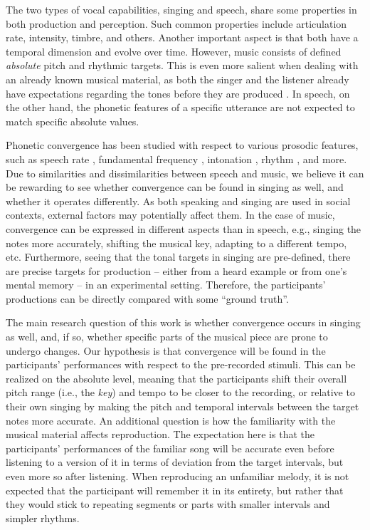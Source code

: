 The two types of vocal capabilities, singing and speech, share some properties in both production and perception.
Such common properties include articulation rate, intensity, timbre, and others.
Another important aspect is that both have a temporal dimension and evolve over time.
However, music consists of defined \emph{absolute} pitch and rhythmic targets.
This is even more salient when dealing with an already known musical material, as both the singer and the listener already have expectations regarding the tones before they are produced \citep{Meyer2008emotion}.
In speech, on the other hand, the phonetic features of a specific utterance are not expected to match specific absolute values.

Phonetic convergence has been studied with respect to various prosodic features, such as speech rate \citep{Schweitzer2013convergence, Pardo2012phonetic}, fundamental frequency \citep{Babel2012role, Collins1998convergence}, intonation \citep{DImperio2014phonetic, Simonet2011intonational}, rhythm \citep{Krivokapic2013rhythm}, and more.
Due to similarities and dissimilarities between speech and music, we believe it can be rewarding to see whether convergence can be found in singing as well, and whether it operates differently.
As both speaking and singing are used in social contexts, external factors may potentially affect them.
In the case of music, convergence can be expressed in different aspects than in speech, e.g., singing the notes more accurately, shifting the musical key, adapting to a different tempo, etc.
Furthermore, seeing that the tonal targets in singing are pre-defined, there are precise targets for production -- either from a heard example or from one's mental memory -- in an experimental setting.
Therefore, the participants' productions can be directly compared with some \enquote{ground truth}.

The main research question of this work is whether convergence occurs in singing as well, and, if so, whether specific parts of the musical piece are prone to undergo changes.
Our hypothesis is that convergence will be found in the participants' performances with respect to the pre-recorded stimuli.
This can be realized on the absolute level, meaning that the participants shift their overall pitch range (i.e., the \emph{key}) and tempo to be closer to the recording, or relative to their own singing by making the pitch and temporal intervals between the target notes more accurate.
An additional question is how the familiarity with the musical material affects reproduction.
The expectation here is that the participants' performances of the familiar song will be accurate even before listening to a version of it in terms of deviation from the target intervals, but even more so after listening.
When reproducing an unfamiliar melody, it is not expected that the participant will remember it in its entirety, but rather that they would stick to repeating segments or parts with smaller intervals and simpler rhythms.

